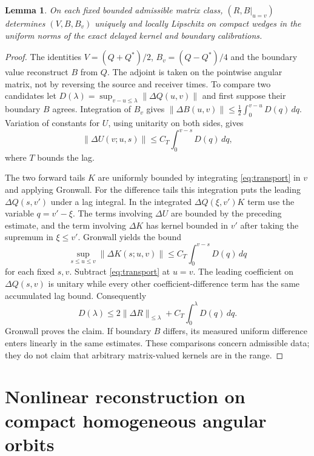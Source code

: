 \documentclass[11pt]{article}
\newtheorem{lemma}[theorem]{Lemma}
\begin{document}
\begin{lemma}\label{lem:matrix}
On each fixed bounded admissible matrix class, \((R,B|_{u=v})\) determines \((V,B,B_v)\) uniquely and locally Lipschitz on compact wedges in the uniform norms of the exact delayed kernel and boundary calibrations.
\end{lemma}
\begin{proof}
The identities \(V=(Q+Q^*)/2\), \(B_v=(Q-Q^*)/4\) and the boundary value reconstruct \(B\) from \(Q\). The adjoint is taken on the pointwise angular matrix, not by reversing the source and receiver times. To compare two candidates let \(D(\lambda)=\sup_{v-u\le\lambda}\|\Delta Q(u,v)\|\) and first suppose their boundary \(B\) agrees. Integration of \(B_v\) gives \(\|\Delta B(u,v)\|\le\tfrac12\int_0^{v-u}D(q)\,dq\). Variation of constants for \(U\), using unitarity on both sides, gives
\[
 \|\Delta U(v;u,s)\|\le C_T\int_0^{v-s}D(q)\,dq ,
\]
where \(T\) bounds the lag.

The two forward tails \(K\) are uniformly bounded by integrating \eqref{eq:transport} in \(v\) and applying Gronwall. For the difference tails this integration puts the leading \(\Delta Q(s,v')\) under a lag integral. In the integrated \(\Delta Q(\xi,v')K\) term use the variable \(q=v'-\xi\). The terms involving \(\Delta U\) are bounded by the preceding estimate, and the term involving \(\Delta K\) has kernel bounded in \(v'\) after taking the supremum in \(\xi\le v'\). Gronwall yields the bound
\[
  \sup_{s\le u\le v}\|\Delta K(s;u,v)\|\le C_T\int_0^{v-s}D(q)\,dq
\]
for each fixed \(s,v\). Subtract \eqref{eq:transport} at \(u=v\). The leading coefficient on \(\Delta Q(s,v)\) is unitary while every other coefficient-difference term has the same accumulated lag bound. Consequently
\[
 D(\lambda)\le 2\|\Delta R\|_{\le\lambda}
     +C_T\int_0^\lambda D(q)\,dq .
\]
Gronwall proves the claim. If boundary \(B\) differs, its measured uniform difference enters linearly in the same estimates. These comparisons concern admissible data; they do not claim that arbitrary matrix-valued kernels are in the range.
\end{proof}

\section{Nonlinear reconstruction on compact homogeneous angular orbits}
\end{document}
